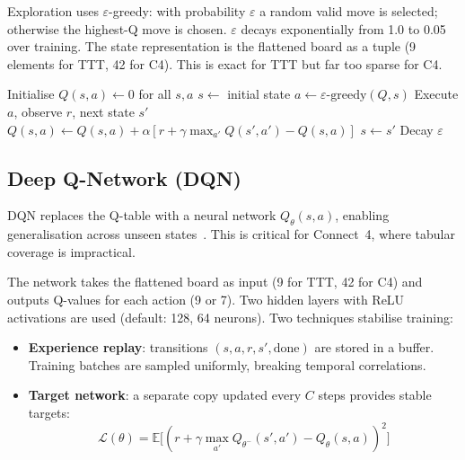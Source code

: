 \documentclass[12pt, a4paper]{article}
\begin{document}
Exploration uses $\varepsilon$-greedy: with probability $\varepsilon$ a random valid move is
selected; otherwise the highest-Q move is chosen. $\varepsilon$ decays exponentially from 1.0 to
0.05 over training. The state representation is the flattened board as a tuple (9 elements for
TTT, 42 for C4). This is exact for TTT but far too sparse for C4.

\begin{algorithm}[H]
\caption{Q-Learning Training Loop}
\begin{algorithmic}[1]
\State Initialise $Q(s,a) \leftarrow 0$ for all $s, a$
    \State $s \leftarrow$ initial state
        \State $a \leftarrow \varepsilon\text{-greedy}(Q, s)$
        \State Execute $a$, observe $r$, next state $s'$
        \State $Q(s,a) \leftarrow Q(s,a) + \alpha[r + \gamma \max_{a'} Q(s',a') - Q(s,a)]$
        \State $s \leftarrow s'$
    \EndWhile
    \State Decay $\varepsilon$
\EndFor
\end{algorithmic}
\end{algorithm}


\subsection{Deep Q-Network (DQN)}

DQN replaces the Q-table with a neural network $Q_\theta(s, a)$, enabling generalisation
across unseen states~\cite{mnih2015}. This is critical for Connect~4, where tabular coverage
is impractical.

The network takes the flattened board as input (9 for TTT, 42 for C4) and outputs Q-values for
each action (9 or 7). Two hidden layers with ReLU activations are used (default: 128, 64
neurons). Two techniques stabilise training:

\begin{itemize}
    \item \textbf{Experience replay}: transitions $(s, a, r, s', \text{done})$ are stored in a
          buffer. Training batches are sampled uniformly, breaking temporal correlations.
    \item \textbf{Target network}: a separate copy updated every $C$ steps provides stable
          targets:
          \begin{equation}
              \mathcal{L}(\theta) = \mathbb{E}\bigl[(r + \gamma \max_{a'} Q_{\theta^-}(s', a')
              - Q_\theta(s, a))^2\bigr]
          \end{equation}
\end{itemize}
\end{document}
